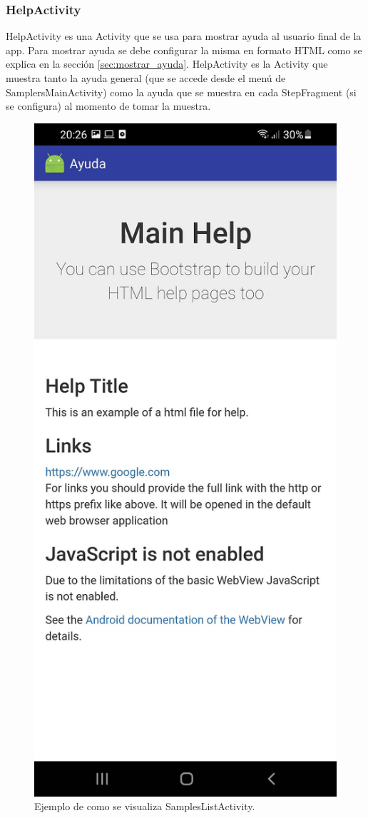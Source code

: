 \subsubsection{HelpActivity}
HelpActivity es una Activity que se usa para mostrar ayuda al usuario final de la app. Para mostrar ayuda se debe configurar la misma en formato HTML como se explica en la sección \ref{sec:mostrar_ayuda}. HelpActivity es la Activity que muestra tanto la ayuda general (que se accede desde el menú de SamplersMainActivity) como la ayuda que se muestra en cada StepFragment (si se configura) al momento de tomar la muestra.

\begin{figure}[H]
  \centering
    \includegraphics[scale=0.3]{05-implementacion/HelpActivity.png} 
   \caption{Ejemplo de como se visualiza SamplesListActivity.}
\end{figure}	



